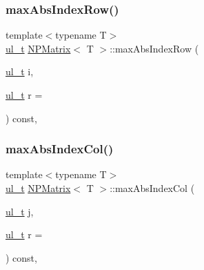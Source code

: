 \subsubsection{\texorpdfstring{maxAbsIndexRow()}{maxAbsIndexRow()}}
{\footnotesize\ttfamily template$<$typename T$>$ \\
\mbox{\hyperlink{typedef_8h_a1b140a2034db3f5dfe18a987745df43a}{ul\+\_\+t}} \mbox{\hyperlink{class_n_p_matrix}{N\+P\+Matrix}}$<$ T $>$\+::max\+Abs\+Index\+Row (\begin{DoxyParamCaption}\item[{\mbox{\hyperlink{typedef_8h_a1b140a2034db3f5dfe18a987745df43a}{ul\+\_\+t}}}]{i,  }\item[{\mbox{\hyperlink{typedef_8h_a1b140a2034db3f5dfe18a987745df43a}{ul\+\_\+t}}}]{r = {} }\end{DoxyParamCaption}) const\hspace{0.3cm}{\ttfamily [inline]}, {\ttfamily [protected]}}

\mbox{\label{class_n_p_matrix_a2b5a2c3d646df900367ad91450d1ef33}} 
\subsubsection{\texorpdfstring{maxAbsIndexCol()}{maxAbsIndexCol()}}
{\footnotesize\ttfamily template$<$typename T$>$ \\
\mbox{\hyperlink{typedef_8h_a1b140a2034db3f5dfe18a987745df43a}{ul\+\_\+t}} \mbox{\hyperlink{class_n_p_matrix}{N\+P\+Matrix}}$<$ T $>$\+::max\+Abs\+Index\+Col (\begin{DoxyParamCaption}\item[{\mbox{\hyperlink{typedef_8h_a1b140a2034db3f5dfe18a987745df43a}{ul\+\_\+t}}}]{j,  }\item[{\mbox{\hyperlink{typedef_8h_a1b140a2034db3f5dfe18a987745df43a}{ul\+\_\+t}}}]{r = {} }\end{DoxyParamCaption}) const\hspace{0.3cm}{\ttfamily [inline]}, {\ttfamily [protected]}}

\mbox{\label{class_n_p_matrix_a8bb14c131409b94a8b52ec6a932098e5}} 
